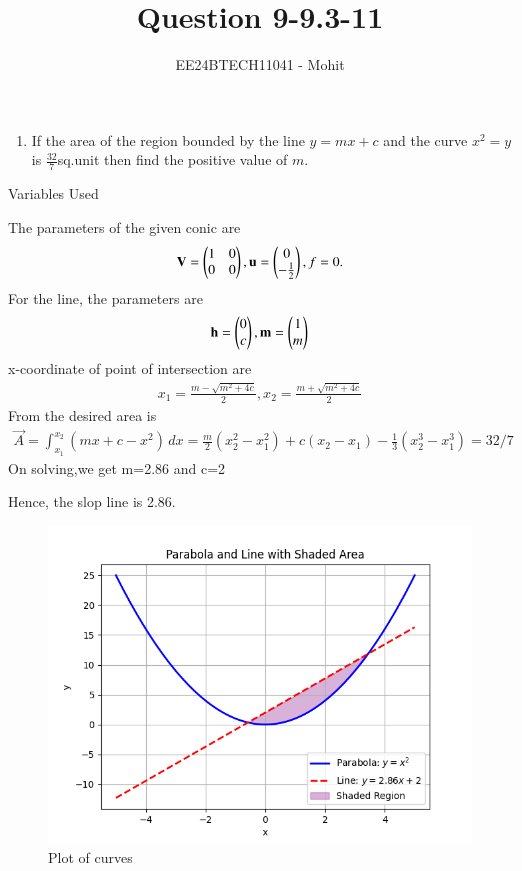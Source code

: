 \documentclass[journal]{IEEEtran}
\numberwithin{equation}{enumi}
\numberwithin{figure}{enumi}
\begin{document}

\title{Question 9-9.3-11}
\author{EE24BTECH11041 - Mohit}
{\let\newpage\relax\maketitle}
\begin{enumerate}
\item 
If the area of the region bounded by the line $y=mx+c$ and the curve $x^2=y$ is $\frac{32}{7}$sq.unit then find the positive value of $m$.
\end{enumerate}
\begin{table}[h!]    
  \centering
  
  \caption{Variables Used}
  \label{tab 1.4.9.2}
\end{table}
	
The parameters of the given conic are
\begin{align}
\mathbf{V}=\begin{pmatrix}
1 & 0\\
0 & 0
\end{pmatrix},
\mathbf{u}=\begin{pmatrix}0\\-\frac{1}{2}\end{pmatrix},
f=0.
\end{align} 
For the line, the parameters are
\begin{align}
\mathbf{h} = \begin{pmatrix}
0\\
c
\end{pmatrix},
\mathbf{m} = \begin{pmatrix}1 \\ m\end{pmatrix}
\end{align}
x-coordinate of point of intersection are 
\begin{align}
    x_1=\frac{m-\sqrt{m^2+4c}}{2},x_2=\frac{m+\sqrt{m^2+4c}}{2}
\end{align}
From the desired area is 
\begin{align}
\vec{A}=\int_{x_1}^{x_2} (mx+c-x^2) \,dx = \frac{m}{2}(x_2^2-x_1^2) + c(x_2-x_1) -\frac{1}{3}(x_2^3 - x_1^3) = 32/7
\end{align}
On solving,we get m=2.86 and c=2
 
Hence, the slop line is 2.86.
\begin{figure}[h!]
   \centering
   \includegraphics[width=0.7\linewidth]{figs/Figure_1.png}
   \caption{Plot of curves}
   \label{stemplot}
\end{figure}
\end{document}
